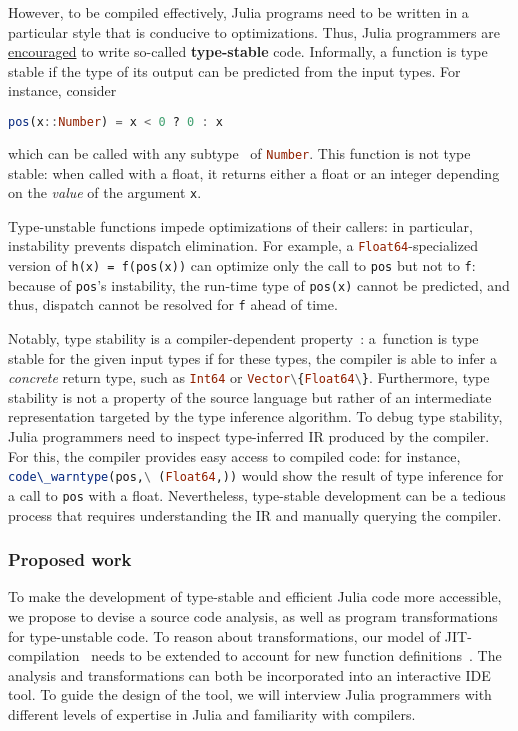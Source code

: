 \documentclass[twocolumn]{article}
\newcommand{\jlc}[1]{\lstinline[language=Julia]|#1|\xspace}
\begin{document}
However, to be compiled effectively,
Julia programs need to be written in a particular style
that is conducive to optimizations. Thus, %
Julia programmers are
\href{https://docs.julialang.org/en/v1/manual/performance-tips/#Write-%22type-stable%22-functions}{encouraged}
to write so-called \textbf{type-stable} code. Informally, a
function is type stable if the type of its output can be predicted from
the input types. For instance, consider
\begin{lstlisting}[language=Julia]
  pos(x::Number) = x < 0 ? 0 : x
\end{lstlisting}
which can be called with any subtype~\cite{subtyping} of \jlc{Number}.
This function is not type stable: when called with a float,
it returns either a float or an
integer depending on the \emph{value} of the argument \texttt{x}.

Type-unstable functions impede optimizations of their callers: in
particular, instability prevents dispatch elimination. For example, a
\jlc{Float64}-specialized version of \texttt{h(x)\ =\ f(pos(x))} can
optimize only the call to \texttt{pos} but not to \texttt{f}: because of
\texttt{pos}'s instability, the run-time type of \texttt{pos(x)} cannot
be predicted, and thus, dispatch cannot be resolved for \texttt{f} ahead
of time.

Notably, type stability is a compiler-dependent property~\cite{stability}:
a~function is type stable for the given input types
if for these types, the compiler is able to infer a \emph{concrete}
return type, such as \jlc{Int64} or \jlc{Vector\{Float64\}}.
Furthermore, type stability is not a property of the source language but
rather of an intermediate representation targeted by the type inference
algorithm. To debug type stability, Julia programmers need to inspect
type-inferred IR produced by the compiler. For this, the compiler
provides easy access to compiled code: for instance,
\jlc{code\_warntype(pos,\ (Float64,))} would show the result of type
inference for a call to \texttt{pos} with a float. Nevertheless,
type-stable development can be a tedious process that requires
understanding the IR and manually querying the compiler.

\subsubsection*{Proposed work}\label{proposed-work}

To make the development of type-stable and efficient Julia code more
accessible, we propose to devise a source code analysis, as well as
program transformations for type-unstable code.
To reason about transformations, our model of JIT-compilation~\cite{stability}
needs to be extended to account for new function definitions~\cite{worldage}.
The analysis and
transformations can both be incorporated into an interactive IDE tool.
To guide the design of the tool, we will interview Julia programmers
with different levels of expertise in Julia and familiarity with
compilers.
\end{document}
